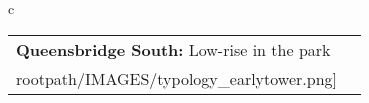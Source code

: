 \begin{table}[H]
        \begin{tabular}{c}
        \begin{tabular}{m{1.5in} m{2in}}
\textbf{Queensbridge South:} {Low-rise in the park} & \texttt{[image: \\rootpath/IMAGES/typology\_earlytower.png]}
\end{tabular}\end{tabular}
        \end{table}